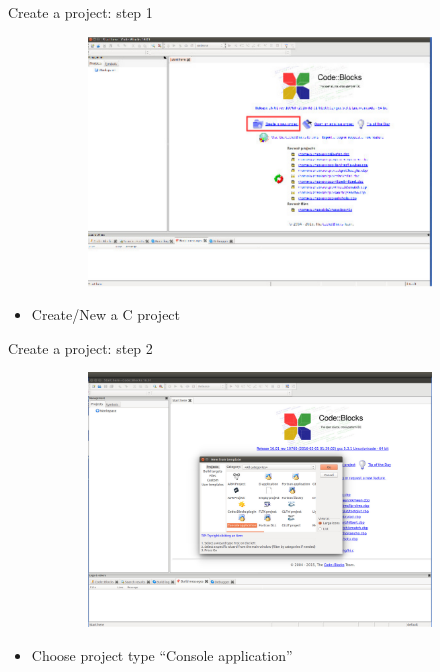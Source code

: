 \begin{frame}{Create a project: step 1}
	\begin{figure}
		\begin{center}
			\begin{figure}
				\includegraphics[width=0.8\linewidth]{figs/cbx1.pdf}
			\end{figure}
		\end{center}
	\end{figure}
	\begin{itemize}
		\item {Create/New a C project}
	\end{itemize}
\end{frame}

\begin{frame}{Create a project: step 2}
	\begin{figure}
		\begin{center}
			\begin{figure}
				\includegraphics[width=0.8\linewidth]{figs/cb2.pdf}
			\end{figure}
		\end{center}
	\end{figure}
	\begin{itemize}
		\item {Choose project type ``Console application''}
	\end{itemize}
\end{frame}


